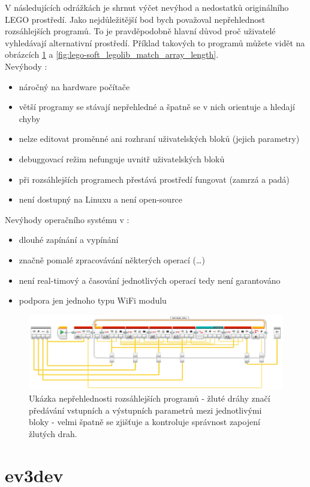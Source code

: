 V následujících odrážkách je shrnut výčet nevýhod a nedostatků originálního LEGO prostředí. 
Jako nejdůležitější bod bych považoval nepřehlednost rozsáhlejších programů. %
To je pravděpodobně hlavní důvod proč uživatelé \legoM{} vyhledávají alternativní prostředí. 
Příklad takových to programů můžete vidět na obrázcích \ref{fig:lego-soft_legolib_converge_array} a \ref{fig:lego-soft_legolib_match_array_length}. \\

Nevýhody \legoSW:
\renewcommand{\labelitemi}{$-$}
\begin{itemize}[noitemsep]\itemsep2pt
	\item náročný na hardware počítače
	\item větší programy se stávají nepřehledné a špatně se v nich orientuje a hledají chyby
	\item nelze editovat proměnné ani rozhraní uživatelských bloků (jejich parametry)
	\item debuggovací režim nefunguje uvnitř uživatelských bloků
	\item při rozsáhlejších programech přestává prostředí fungovat (zamrzá a padá)
	\item není dostupný na Linuxu a není open-source
\end{itemize}

Nevýhody operačního systému v :  %
\begin{itemize}[noitemsep]\itemsep2pt
	\item dlouhé zapínání a vypínání
	\item značně pomalé zpracovávání některých operací (\dots) %
	\item není real-timový a časování jednotlivých operací tedy není garantováno
	\item podpora jen jednoho typu WiFi modulu
\end{itemize}

\begin{figure}[h]
	\centering
	\includegraphics[width=\textwidth]{images/lego-soft/lego-soft_legolib_converge_array.png}
	\caption[Ukázka nepřehlednosti rozsáhlejších programů]{Ukázka nepřehlednosti rozsáhlejších programů - žluté dráhy značí předávání vstupních a výstupních parametrů mezi jednotlivými bloky - velmi špatně se zjišťuje a kontroluje správnost zapojení žlutých drah.}
	\label{fig:lego-soft_legolib_converge_array}
\end{figure}

\section{ev3dev}

